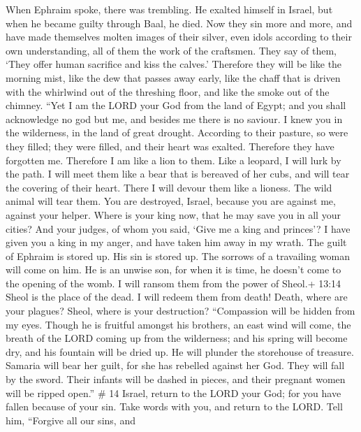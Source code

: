  When Ephraim spoke, there was trembling. He exalted himself
in Israel, but when he became guilty through Baal, he died. 
Now they sin more and more, and have made themselves molten images of
their silver, even idols according to their own understanding, all of
them the work of the craftsmen. They say of them, `They offer human
sacrifice and kiss the calves.'  Therefore they will be like
the morning mist, like the dew that passes away early, like the chaff
that is driven with the whirlwind out of the threshing floor, and like
the smoke out of the chimney.  ``Yet I am the LORD your God
from the land of Egypt; and you shall acknowledge no god but me, and
besides me there is no saviour.  I knew you in the
wilderness, in the land of great drought.  According to
their pasture, so were they filled; they were filled, and their heart
was exalted. Therefore they have forgotten me.  Therefore I
am like a lion to them. Like a leopard, I will lurk by the path.
 I will meet them like a bear that is bereaved of her cubs,
and will tear the covering of their heart. There I will devour them like
a lioness. The wild animal will tear them.  You are
destroyed, Israel, because you are against me, against your helper.
 Where is your king now, that he may save you in all your
cities? And your judges, of whom you said, `Give me a king and princes'?
 I have given you a king in my anger, and have taken him
away in my wrath.  The guilt of Ephraim is stored up. His
sin is stored up.  The sorrows of a travailing woman will
come on him. He is an unwise son, for when it is time, he doesn't come
to the opening of the womb.  I will ransom them from the
power of Sheol.+ 13:14 Sheol is the place of the dead. I will redeem
them from death! Death, where are your plagues? Sheol, where is your
destruction? ``Compassion will be hidden from my eyes. 
Though he is fruitful amongst his brothers, an east wind will come, the
breath of the LORD coming up from the wilderness; and his spring will
become dry, and his fountain will be dried up. He will plunder the
storehouse of treasure.  Samaria will bear her guilt, for
she has rebelled against her God. They will fall by the sword. Their
infants will be dashed in pieces, and their pregnant women will be
ripped open.'' \# 14  Israel, return to the LORD your God;
for you have fallen because of your sin.  Take words with
you, and return to the LORD. Tell him, ``Forgive all our sins, and
